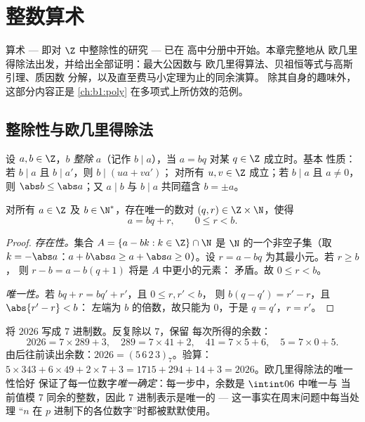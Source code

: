 \chapter{整数算术}\label{ch:b1:arith}

算术 --- 即对 $\Z$ 中整除性的研究 --- 已在
高中分册中开始。本章完整地从
欧几里得除法出发，并给出全部证明：最大公因数与
欧几里得算法、贝祖恒等式与高斯引理、质因数
分解，以及直至费马小定理为止的同余演算。
除其自身的趣味外，这部分内容正是
\cref{ch:b1:poly} 在多项式上所仿效的范例。

\section{整除性与欧几里得除法}

\begin{definition}[整除性]\label{def:b1:arith:divides}
设 $a, b \in \Z$，$b$ \emph{整除} $a$（记作 $b \mid
a$），当 $a = bq$ 对某 $q \in \Z$ 成立时。基本
性质：若 $b \mid a$ 且 $b \mid a'$，则 $b \mid (ua + va')$；
对所有 $u, v \in \Z$ 成立；若 $b \mid a$ 且 $a \neq 0$，则 $\abs b \leq
\abs a$；又 $a \mid b$ 与 $b \mid a$ 共同蕴含 $b = \pm a$。
\end{definition}

\begin{theorem}[欧几里得除法]\label{thm:b1:arith:division}
对所有 $a \in \Z$ 及 $b \in \N^*$，存在唯一的数对 $(q, r)
\in \Z \times \N$，使得
\[
a = bq + r, \qquad 0 \leq r < b .
\]
\end{theorem}

\begin{proof}
\emph{存在性。}集合 $A = \{a - bk : k \in \Z\} \cap \N$ 是
$\N$ 的一个非空子集（取 $k = -\abs a$：$a + b\abs a \geq a +
\abs a \geq 0$）。设 $r = a - bq$ 为其最小元。若 $r \geq b$，
则 $r - b = a - b(q+1)$ 将是 $A$ 中更小的元素：
矛盾。故 $0 \leq r < b$。

\emph{唯一性。}若 $bq + r = bq' + r'$，且 $0 \leq r, r' < b$，
则 $b(q - q') = r' - r$，且 $\abs{r' - r} < b$：
左端为 $b$ 的倍数，故只能为 $0$，于是 $q = q'$，$r = r'$。
\end{proof}

\begin{example}[用反复除法进行位值记数]\label{ex:b1:arith:base7}
将 $2026$ 写成 $7$ 进制数。反复除以 $7$，保留
每次所得的余数：
\[
2026 = 7 \times 289 + 3, \quad
289 = 7 \times 41 + 2, \quad
41 = 7 \times 5 + 6, \quad
5 = 7 \times 0 + 5 .
\]
由后往前读出余数：$2026 =
(5\,6\,2\,3)_7$。验算：$5 \times 343 + 6 \times 49 + 2 \times 7
+ 3 = 1715 + 294 + 14 + 3 = 2026$。欧几里得除法的唯一性恰好
保证了每一位数字\emph{唯一确定}：每一步中，余数是
$\intint06$ 中唯一与
当前值模 $7$ 同余的整数，因此 $7$ 进制表示是唯一的 ---
这一事实在周末问题中每当处理
“$n$ 在 $p$ 进制下的各位数字”时都被默默使用。
\end{example}


